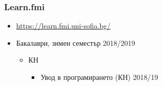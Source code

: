 \documentclass{beamer}
\begin{document}
\begin{frame}
  \frametitle{Learn.fmi}
  
  \begin{itemize}
  \item \url{https://learn.fmi.uni-sofia.bg/}
  \item Бакалаври, зимен семестър 2018/2019
    \begin{itemize}
    \item КН
      \begin{itemize}
      \item Увод в програмирането (КН) 2018/19
      \end{itemize}
    \end{itemize}
  \end{itemize}
\end{frame}
\end{document}
